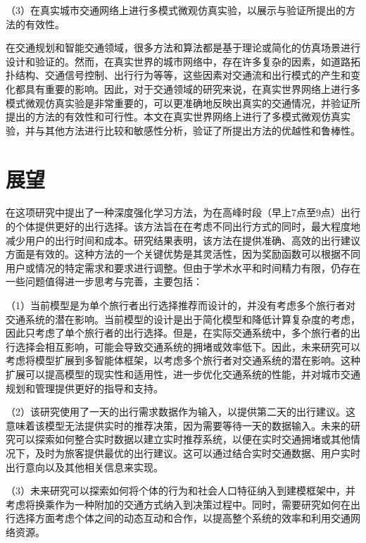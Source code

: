 （3）在真实城市交通网络上进行多模式微观仿真实验，以展示与验证所提出的方法的有效性。

在交通规划和智能交通领域，很多方法和算法都是基于理论或简化的仿真场景进行设计和验证的。然而，在真实世界的城市网络中，存在许多复杂的因素，如道路拓扑结构、交通信号控制、出行行为等等，这些因素对交通流和出行模式的产生和变化都具有重要的影响。因此，对于交通领域的研究来说，在真实世界网络上进行多模式微观仿真实验是非常重要的，可以更准确地反映出真实的交通情况，并验证所提出的方法的有效性和可行性。本文在真实世界网络上进行了多模式微观仿真实验，并与其他方法进行比较和敏感性分析，验证了所提出方法的优越性和鲁棒性。

\section{展望}

在这项研究中提出了一种深度强化学习方法，为在高峰时段（早上7点至9点）出行的个体提供更好的出行选择。该方法旨在在考虑不同出行方式的同时，最大程度地减少用户的出行时间和成本。研究结果表明，该方法在提供准确、高效的出行建议方面是有效的。这种方法的一个关键优势是其灵活性，因为奖励函数可以根据不同用户或情况的特定需求和要求进行调整。但由于学术水平和时间精力有限，仍存在一些问题值得进一步思考与完善，主要包括：

（1）当前模型是为单个旅行者出行选择推荐而设计的，并没有考虑多个旅行者对交通系统的潜在影响。当前模型的设计是出于简化模型和降低计算复杂度的考虑，因此只考虑了单个旅行者的出行选择。但是，在实际交通系统中，多个旅行者的出行选择会相互影响，可能会导致交通系统的拥堵或效率低下。因此，未来研究可以考虑将模型扩展到多智能体框架，以考虑多个旅行者对交通系统的潜在影响。这种扩展可以提高模型的现实性和适用性，进一步优化交通系统的性能，并对城市交通规划和管理提供更好的指导和支持。

（2）该研究使用了一天的出行需求数据作为输入，以提供第二天的出行建议。这意味着该模型无法提供实时的推荐决策，因为需要等待一天的数据输入。未来的研究可以探索如何整合实时数据以建立实时推荐系统，以便在实时交通拥堵或其他情况下，及时为旅客提供最优的出行建议。这可以通过结合实时交通数据、用户实时出行意向以及其他相关信息来实现。

（3）未来研究可以探索如何将个体的行为和社会人口特征纳入到建模框架中，并考虑将换乘作为一种附加的交通方式纳入到决策过程中。同时，需要研究如何在出行选择方面考虑个体之间的动态互动和合作，以提高整个系统的效率和利用交通网络资源。